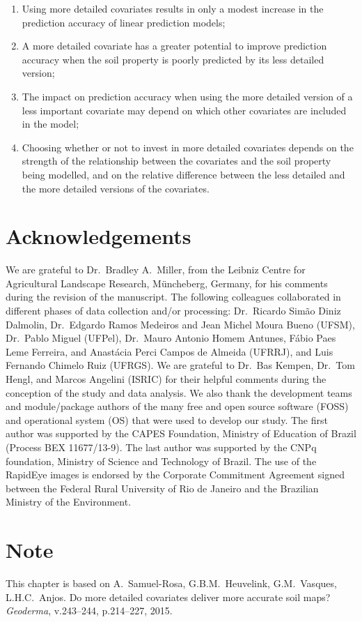 \begin{enumerate}
 \item Using more detailed covariates results in only a modest increase in the prediction accuracy of linear 
 prediction models;
 
 \item A more detailed covariate has a greater potential to improve prediction accuracy when the soil property
 is poorly predicted by its less detailed version;
 
 \item The impact on prediction accuracy when using the more detailed version of a less important covariate 
 may depend on which other covariates are included in the model;
 
 \item Choosing whether or not to invest in more detailed covariates depends on the strength of the 
 relationship between the covariates and the soil property being modelled, and on the relative difference 
 between the less detailed and the more detailed versions of the covariates.
\end{enumerate}

\section*{Acknowledgements}

We are grateful to Dr.~Bradley A.~Miller, from the Leibniz Centre for Agricultural Landscape Research, 
M\"uncheberg, Germany, for his comments during the revision of the manuscript. The following colleagues 
collaborated in different phases of data collection and/or processing: Dr.~Ricardo Simão Diniz Dalmolin, 
Dr.~Edgardo Ramos Medeiros and Jean Michel Moura Bueno (UFSM), Dr.~Pablo Miguel (UFPel), Dr.~Mauro Antonio 
Homem Antunes, Fábio Paes Leme Ferreira, and Anastácia Perci Campos de Almeida (UFRRJ), and Luis Fernando 
Chimelo Ruiz (UFRGS). We are grateful to Dr.~Bas Kempen, Dr.~Tom Hengl, and Marcos Angelini (ISRIC) for their 
helpful comments during the conception of the study and data analysis. We also thank the development teams and 
module/package authors of the many free and open source software (FOSS) and operational system (OS) that were 
used to develop our study. The first author was supported by the CAPES Foundation, Ministry of Education of 
Brazil (Process BEX 11677/13-9). The last author was supported by the CNPq foundation, Ministry of Science and 
Technology of Brazil. The use of the RapidEye images is endorsed by the Corporate Commitment Agreement signed 
between the Federal Rural University of Rio de Janeiro and the Brazilian Ministry of the Environment.

\section*{Note}

This chapter is based on A.~Samuel-Rosa, G.B.M.~Heuvelink, G.M.~Vasques, L.H.C.~Anjos. Do more detailed 
covariates deliver more accurate soil maps? \textit{Geoderma}, v.243--244, p.214--227, 2015.
